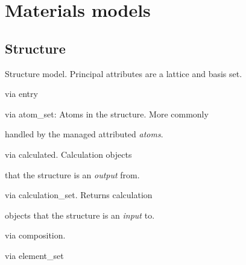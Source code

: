 \documentclass[letterpaper,10pt,english]{sphinxmanual}
\begin{document}
\section{Materials models}
\label{models:materials-models}

\subsection{Structure}
\label{models:structure}

\begin{fulllineitems}
\label{models:qmpy.Structure}
Structure model. Principal attributes are a lattice and basis set.
\begin{description}
\item[{Relationships:}] \leavevmode
\begin{DUlineblock}{0em}
\item[] {\hyperref[models:qmpy.Entry]{}} via entry
\item[] {\hyperref[models:qmpy.Atom]{}} via atom\_set: Atoms in the structure. More commonly
\item[]
\begin{DUlineblock}{\DUlineblockindent}
\item[] handled by the managed attributed \emph{atoms}.
\end{DUlineblock}
\item[] {\hyperref[models:qmpy.Calculation]{}} via calculated. Calculation objects
\item[]
\begin{DUlineblock}{\DUlineblockindent}
\item[] that the structure is an \emph{output} from.
\end{DUlineblock}
\item[] {\hyperref[models:qmpy.Calculation]{}} via calculation\_set. Returns calculation
\item[]
\begin{DUlineblock}{\DUlineblockindent}
\item[] objects that the structure is an \emph{input} to.
\end{DUlineblock}
\item[] {\hyperref[models:qmpy.Composition]{}} via composition.
\item[] {\hyperref[models:qmpy.Element]{}} via element\_set

\end{DUlineblock}
\end{description}
\end{fulllineitems}
\end{document}
